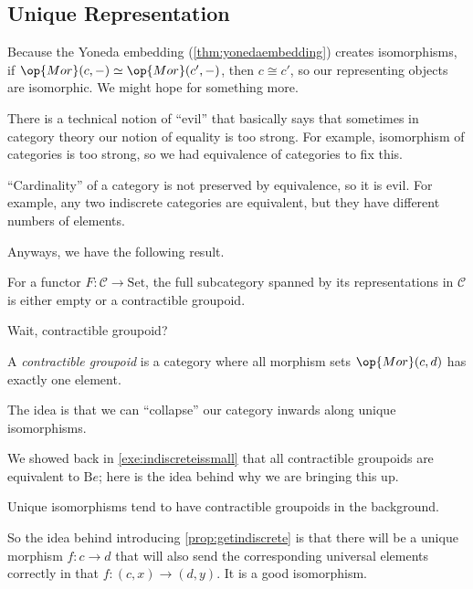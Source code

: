 \subsection{Unique Representation}
Because the Yoneda embedding (\autoref{thm:yonedaembedding}) creates isomorphisms, if $\op{Mor}(c,-)\simeq\op{Mor}(c',-)$, then $c\cong c'$, so our representing objects are isomorphic. We might hope for something more.
\begin{remark}
	There is a technical notion of ``evil'' that basically says that sometimes in category theory our notion of equality is too strong. For example, isomorphism of categories is too strong, so we had equivalence of categories to fix this.
\end{remark}
\begin{example}
	``Cardinality'' of a category is not preserved by equivalence, so it is evil. For example, any two indiscrete categories are equivalent, but they have different numbers of elements.
\end{example}
Anyways, we have the following result.
\begin{proposition} \label{prop:getindiscrete}
	For a functor $F:\mathcal C\to\mathrm{Set}$, the full subcategory spanned by its representations in $\mathcal C$ is either empty or a contractible groupoid.
\end{proposition}
Wait, contractible groupoid?
\begin{definition}
	A \textit{contractible groupoid} is a category where all morphism sets $\op{Mor}(c,d)$ has exactly one element.
\end{definition}
\begin{remark}
	The idea is that we can ``collapse'' our category inwards along unique isomorphisms.
\end{remark}
We showed back in \autoref{exe:indiscreteissmall} that all contractible groupoids are equivalent to $\mathrm Be$; here is the idea behind why we are bringing this up.
\begin{idea}
	Unique isomorphisms tend to have contractible groupoids in the background.
\end{idea}
So the idea behind introducing \autoref{prop:getindiscrete} is that there will be a unique morphism $f:c\to d$ that will also send the corresponding universal elements correctly in that $f:(c,x)\to(d,y)$. It is a good isomorphism.

